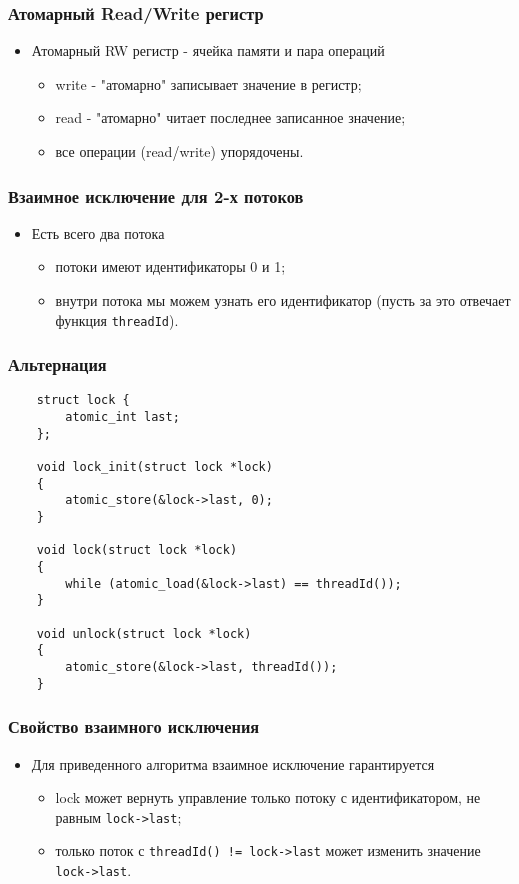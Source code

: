 \begin{frame}
\frametitle{Атомарный Read/Write регистр}
\begin{itemize}
    \item<1->Атомарный RW регистр - ячейка памяти и пара операций
    \begin{itemize}
        \item<2->write - "атомарно" записывает значение в регистр;
        \item<3->read - "атомарно" читает последнее записанное значение;
        \item<4->все операции (read/write) упорядочены.
    \end{itemize}
\end{itemize}
\end{frame}

\begin{frame}
\frametitle{Взаимное исключение для 2-х потоков}
\begin{itemize}
    \item<1->Есть всего два потока
    \begin{itemize}
        \item<2->потоки имеют идентификаторы 0 и 1;
        \item<3->внутри потока мы можем узнать его идентификатор (пусть за
             это отвечает функция \lstinline|threadId|).
    \end{itemize}
\end{itemize}
\end{frame}

\begin{frame}[fragile]
\frametitle{Альтернация}
\begin{lstlisting}
    struct lock {
        atomic_int last;
    };

    void lock_init(struct lock *lock)
    {
        atomic_store(&lock->last, 0);
    }

    void lock(struct lock *lock)
    {
        while (atomic_load(&lock->last) == threadId());
    }

    void unlock(struct lock *lock)
    {
        atomic_store(&lock->last, threadId());
    }
\end{lstlisting}
\end{frame}

\begin{frame}
\frametitle{Свойство взаимного исключения}
\begin{itemize}
    \item<1->Для приведенного алгоритма взаимное исключение гарантируется
    \begin{itemize}
        \item<2->lock может вернуть управление только потоку с
             идентификатором, не равным \lstinline|lock->last|;
        \item<3->только поток с \lstinline|threadId() != lock->last| может
             изменить значение \lstinline|lock->last|.
    \end{itemize}
\end{itemize}
\end{frame}

